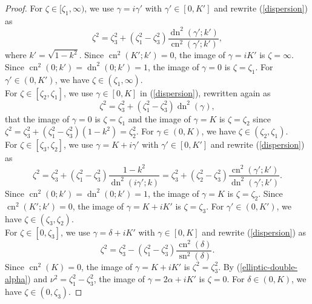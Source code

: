 \documentclass[12pt,reqno]{amsart}
\numberwithin{equation}{section}
\DeclareMathOperator{\sn}{sn}
\DeclareMathOperator{\cn}{cn}
\DeclareMathOperator{\dn}{dn}
\begin{document}
\begin{proof}
	For $\zeta \in [\zeta_1,\infty)$, we use $\gamma = i \gamma'$ with $\gamma' \in [0,K']$ and rewrite (\ref{dispersion}) as 
	\begin{equation}
	\label{zeta-1}
	\zeta^2 = \zeta_3^2 + (\zeta_1^2 - \zeta_3^2) \frac{\dn^2(\gamma';k')}{\cn^2(\gamma';k')},
	\end{equation}
	where $k' = \sqrt{1-k^2}$. Since $\cn^2(K';k') = 0$, the image of $\gamma = iK'$ is $\zeta = \infty$. Since $\cn^2(0;k') = \dn^2(0;k') = 1$, the image of $\gamma = 0$ is $\zeta = \zeta_1$. For $\gamma' \in (0,K')$, we have $\zeta \in (\zeta_1,\infty)$. \\
	
	For $\zeta \in [\zeta_2,\zeta_1]$, we use $\gamma \in [0,K]$ in (\ref{dispersion}), rewritten again as 
	\begin{equation}
	\label{zeta-12}
	\zeta^2 = \zeta_3^2 + (\zeta_1^2 - \zeta_3^2) \dn^2(\gamma),
	\end{equation}
	that the image of $\gamma = 0$ is $\zeta = \zeta_1$ and the image of $\gamma = K$ is $\zeta = \zeta_2$ since $\zeta^2 = \zeta_3^2 + (\zeta_1^2 - \zeta_3^2) (1-k^2) = \zeta_2^2$. For $\gamma \in (0,K)$, we have $\zeta \in (\zeta_2,\zeta_1)$. \\ 
	
	For $\zeta \in [\zeta_3,\zeta_2]$, we use $\gamma = K + i \gamma'$ with $\gamma' \in [0,K']$ and rewrite (\ref{dispersion}) as 
	\begin{equation}
	\label{zeta-2}
	\zeta^2 = \zeta_3^2 + (\zeta_1^2 - \zeta_3^2) \frac{1-k^2}{\dn^2(i\gamma';k)} = \zeta_3^2 + (\zeta_2^2 - \zeta_3^2) \frac{\cn^2(\gamma';k')}{\dn^2(\gamma';k')}.
	\end{equation}
	Since $\cn^2(0;k') = \dn^2(0;k') = 1$, the image of $\gamma = K$ is $\zeta = \zeta_2$. Since $\cn^2(K';k') = 0$, the image of $\gamma = K + i K'$ is $\zeta = \zeta_3$. For $\gamma' \in (0,K')$, we have $\zeta \in (\zeta_3,\zeta_2)$. \\ 
	
	For $\zeta \in [0,\zeta_3]$, we use $\gamma = \delta + i K'$ with $\gamma \in [0,K]$ and rewrite (\ref{dispersion}) as 
	\begin{equation}
	\label{zeta-3}
	\zeta^2 = \zeta_3^2 - (\zeta_1^2 - \zeta_3^2) \frac{\cn^2(\delta)}{\sn^2(\delta)}.
	\end{equation}
	Since $\cn^2(K) = 0$, the image of $\gamma = K + iK'$ is $\zeta^2 = \zeta_3^2$. By (\ref{elliptic-double-alpha}) and $\nu^2 = \zeta_1^2 - \zeta_3^2$, the image of $\gamma = 2\alpha + i K'$ is $\zeta = 0$. For $\delta \in (0,K)$, we have $\zeta \in (0,\zeta_3)$. 	
\end{proof}
\end{document}
